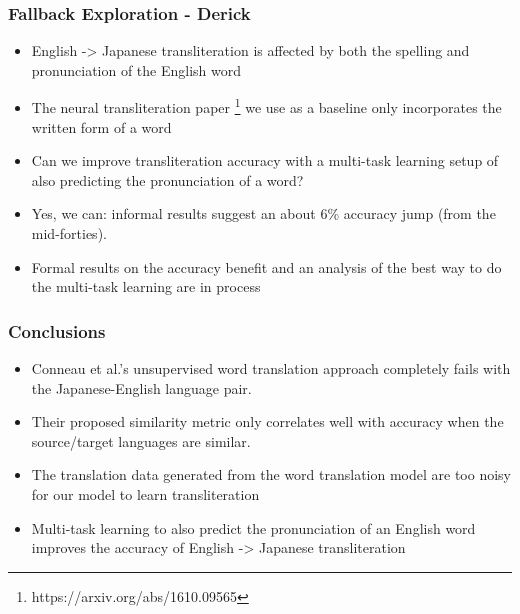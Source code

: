 \documentclass{beamer}
\begin{document}
\begin{frame}
  \frametitle{Fallback Exploration - Derick}
  \begin{itemize}
  \item English -> Japanese transliteration is affected by both the spelling and
    pronunciation of the English word
  \item The neural transliteration paper
    \footnote{https://arxiv.org/abs/1610.09565} we use as a baseline only
    incorporates the written form of a word
  \item Can we improve transliteration accuracy with a multi-task learning
    setup of also predicting the pronunciation of a word?
  \item Yes, we can: informal results suggest an about 6\% accuracy jump (from
    the mid-forties).
  \item Formal results on the accuracy benefit and an analysis of the best way
    to do the multi-task learning are in process
  \end{itemize}
\end{frame}

\begin{frame}
  \frametitle{Conclusions}
  \begin{itemize}
  \item Conneau et al.'s unsupervised word translation approach completely fails
    with the Japanese-English language pair.
  \item Their proposed similarity metric only correlates well with accuracy when
    the source/target languages are similar.
  \item The translation data generated from the word translation model are too
    noisy for our model to learn transliteration
  \item Multi-task learning to also predict the pronunciation of an English word
    improves the accuracy of English -> Japanese transliteration
  \end{itemize}
\end{frame}
\end{document}
